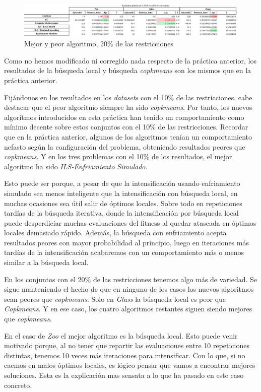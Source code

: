 \documentclass[11pt]{article}
\begin{document}
\begin{figure}[H]
    \centering
    \includegraphics[width=1.0\textwidth]{tablas_mejor_peor_20}
    \caption{Mejor y peor algoritmo, 20\% de las restricciones}
\end{figure}

Como no hemos modificado ni corregido nada respecto de la práctica anterior, los resultados de la búsqueda local y búsqueda \emph{copkmeans} son los mismos que en la práctica anterior.

Fijándonos en los resultados en los \emph{datasets} con el 10\% de las restricciones, cabe destacar que el peor algoritmo siempre ha sido \emph{copkmeans}. Por tanto, los nuevos algoritmos introducidos en esta práctica han tenido un comportamiento como mínimo decente sobre estos conjuntos con el 10\% de las restricciones. Recordar que en la práctica anterior, algunos de los algoritmos tenían un comportamiento nefasto según la configuración del problema, obteniendo resultados peores que \emph{copkmeans}. Y en los tres problemas con el 10\% de los resultados, el mejor algoritmo ha sido \emph{ILS-Enfriamiento Simulado}.

Esto puede ser porque, a pesar de que la intensificación usando enfriamiento simulado sea menos inteligente que la intensificación con búsqueda local, en muchas ocasiones sea útil salir de óptimos locales. Sobre todo en repeticiones tardías de la búsqueda iterativa, donde la intensificación por búsqueda local puede desperdiciar muchas evaluaciones del fitness al quedar atascada en óptimos locales demasiado rápido. Además, la búsqueda con enfriamiento acepta resultados peores con mayor probabilidad al principio, luego en iteraciones más tardías de la intensificación acabaremos con un comportamiento más o menos similar a la búsqueda local.

En los conjuntos con el 20\% de las restricciones tenemos algo más de variedad. Se sigue manteniendo el hecho de que en ninguno de los casos los nuevos algoritmos sean peores que \emph{copkmeans}. Solo en \emph{Glass} la búsqueda local es peor que \emph{Copkmeans}. Y en ese caso, los cuatro algoritmos restantes siguen siendo mejores que \emph{copkmeans}.

En el caso de \emph{Zoo} el mejor algoritmo es la búsqueda local. Esto puede venir motivado porque, al no tener que repartir las evaluaciones entre 10 repeticiones distintas, tenemos 10 veces más iteraciones para intensificar. Con lo que, si no caemos en malos óptimos locales, es lógico pensar que vamos a encontrar mejores soluciones. Esta es la explicación mas sensata a lo que ha pasado en este caso concreto.
\end{document}
